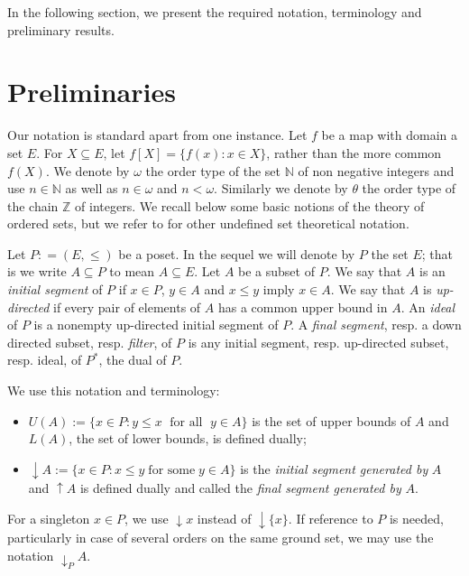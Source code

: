 \documentclass[12pt]{amsart}
\begin{document}
In the following section, we present the required notation,
terminology and preliminary results.

\section{Preliminaries}

Our notation is standard apart from one instance.  Let $f$ be a map with domain a set $E$.
For $X \subseteq E$, let $f[X] = \{ f(x) : x \in X \}$, rather than the more common $f(X)$.
We denote by $\omega$
the order type of the set ${\mathbb{N}}$ of non negative integers and use $n\in
{\mathbb{N}}$ as well as $n \in \omega$ and $n<\omega$.  Similarly  we denote
by $\theta$ the order type of the chain ${\mathbb{Z}}$ of integers. We recall
below some basic notions of the theory of ordered sets, but we refer to
\cite {jech} for other undefined set theoretical notation.  

Let $P: =(E, \leq)$ be a poset. In the sequel we will denote by $P$
the set $E$; that is we write $A \subseteq P$ to mean $A \subseteq
E$. Let $A$ be a subset of $P$.  We say that $A$ is an {\it initial
segment} of $P$ if $x\in P$, $y\in A$ and $x\leq y$ imply $x\in A$. We
say that $A$ is {\it up-directed} if every pair of elements of $A$ has
a common upper bound in $A$. An {\it ideal} of $P$ is a nonempty
up-directed initial segment of $P$.  A {\it final segment}, resp. a
down directed subset, resp.  \emph{filter}, of $P$ is any initial
segment, resp. up-directed subset, resp. ideal, of $P^*$, the dual of
$P$.

We use this notation and terminology:

\begin{itemize}
\item $U(A) :=\{x\in P: y\leq x \; \text{ for all } \; y\in A\}$ is the
set of upper bounds of $A$ and $L(A)$, the set of lower bounds, is
defined dually; 
\item ${\downarrow \!\!}  A := \{x\in P: x\leq y\; \text{for some} \; y\in A\}$ 
is the \emph{initial segment generated by} $A$ and ${\uparrow \!\!} A$
is defined dually and called the \emph{final segment generated by} $A$.
\end{itemize}

For a singleton $x\in P$, we use ${\downarrow \!\!}  x$ instead of ${\downarrow \!\!}  \{x\}$. 
If reference to $P$ is needed, particularly in case of several orders on
the same ground set, we may use the notation $\downarrow_{P} \!\! A$.
\end{document}
